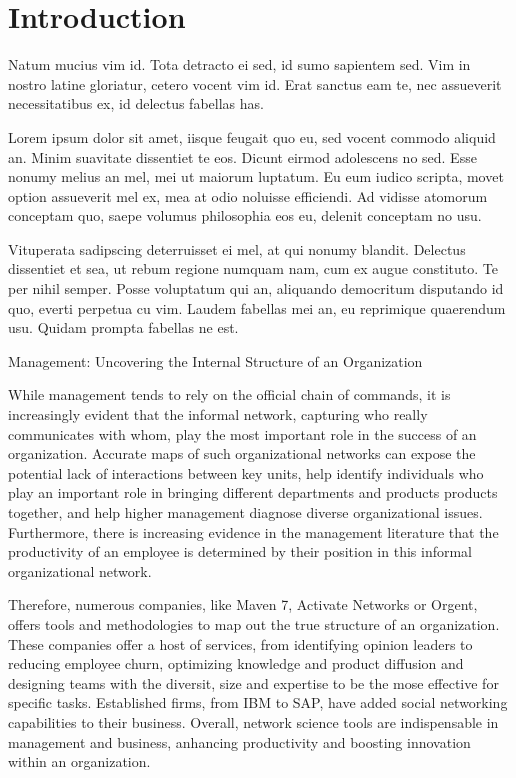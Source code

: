 \chapter{Introduction}

Natum mucius vim id. Tota detracto ei sed, id sumo sapientem sed. Vim in nostro latine gloriatur, cetero vocent vim id. Erat sanctus eam te, nec assueverit necessitatibus ex, id delectus fabellas has.

Lorem ipsum dolor sit amet, iisque feugait quo eu, sed vocent commodo aliquid an. Minim suavitate dissentiet te eos. Dicunt eirmod adolescens no sed. Esse nonumy melius an mel, mei ut maiorum luptatum. Eu eum iudico scripta, movet option assueverit mel ex, mea at odio noluisse efficiendi. Ad vidisse atomorum conceptam quo, saepe volumus philosophia eos eu, delenit conceptam no usu.

Vituperata sadipscing deterruisset ei mel, at qui nonumy blandit. Delectus dissentiet et sea, ut rebum regione numquam nam, cum ex augue constituto. Te per nihil semper. Posse voluptatum qui an, aliquando democritum disputando id quo, everti perpetua cu vim. Laudem fabellas mei an, eu reprimique quaerendum usu. Quidam prompta fabellas ne est.


Management: Uncovering the Internal Structure of an Organization

While management tends to rely on the official chain of commands, it is increasingly evident that the informal network, capturing who really communicates with whom, play the most important role in the success of an organization. Accurate maps of such organizational networks can expose the potential lack of interactions between key units, help identify individuals who play an important role in bringing different departments and products products together, and help higher management diagnose diverse organizational issues. Furthermore, there is increasing evidence in the management literature that the productivity of an employee is determined by their position in this informal organizational network. 

Therefore, numerous companies, like Maven 7, Activate Networks or Orgent, offers tools and methodologies to map out the true structure of an organization. These companies offer a host of services, from identifying opinion leaders to reducing employee churn,  optimizing knowledge and product diffusion and designing teams with the diversit, size and expertise to be the mose effective for specific tasks. Established firms, from IBM to SAP, have added social networking capabilities to their business. Overall, network science tools are indispensable in management and business, anhancing productivity and boosting innovation within an organization. 

